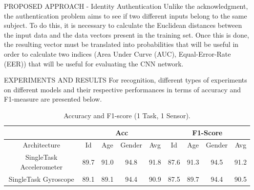\documentclass[10pt]{beamer}
\begin{document}
\begin{frame}{PROPOSED APPROACH - Identity Authentication}
    Unlike the acknowledgment, the authentication problem aims to see if 
    two different inputs belong to the same subject. To do this, it is necessary 
    to calculate the Euclidean distances between the input data and the data 
    vectors present in the training set. Once this is done, the resulting vector 
    must be translated into probabilities that will be useful in order to 
    calculate two indices (Area Under Curve (AUC), Equal-Error-Rate 
    (EER)) that will be useful for evaluating the CNN network.
\end{frame}

\begin{frame}{EXPERIMENTS AND RESULTS}
    For recognition, different types of experiments on different models and 
    their respective performances in terms of accuracy and F1-measure are 
    presented below.
    \begin{minipage}{\linewidth}
        \centering
        \begin{minipage}{0.45\linewidth}
            \begin{table}[h!]
            \centering
                \begin{adjustbox}{max width=\textwidth}
                \begin{tabular}{|c||ccc|c||ccc|c|}
                    \hline
                        & \multicolumn{4}{c||}{Acc} & \multicolumn{4}{c|}{F1-Score} \\
                    \hline
                        Architecture & Id & Age & Gender & Avg & Id & Age & Gender & Avg\\
                    \hline
                        SingleTask Accelerometer & 89.7 & 91.0 & 94.8 & 91.8 & 87.6 & 91.3 & 94.5 & 91.2\\
                        SingleTask Gyroscope& 89.1 & 89.1 & 94.4 & 90.9 & 87.5 & 89.7 & 94.4 & 90.5\\
                    \hline 
                \end{tabular}
                \end{adjustbox}
                \caption{Accuracy and F1-score (1 Task, 1 Sensor).}
                \label{table accuracy and F1 (1 Task - 1 Sensor)}
            \end{table}
            \centering
            \begin{table}[h!]
                \centering
                \begin{adjustbox}{max width=\textwidth}

\end{adjustbox}
\end{table}
\end{minipage}
\end{minipage}
\end{frame}
\end{document}
